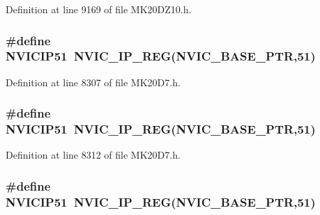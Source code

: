 Definition at line 9169 of file M\+K20\+D\+Z10.\+h.

\subsubsection[{\texorpdfstring{N\+V\+I\+C\+I\+P51}{NVICIP51}}]{\setlength{\rightskip}{0pt plus 5cm}\#define N\+V\+I\+C\+I\+P51~{\bf N\+V\+I\+C\+\_\+\+I\+P\+\_\+\+R\+EG}({\bf N\+V\+I\+C\+\_\+\+B\+A\+S\+E\+\_\+\+P\+TR},51)}\hypertarget{group___n_v_i_c___register___accessor___macros_ga0da79531db3089286af0685f8c06ed7a}{}\label{group___n_v_i_c___register___accessor___macros_ga0da79531db3089286af0685f8c06ed7a}


Definition at line 8307 of file M\+K20\+D7.\+h.

\subsubsection[{\texorpdfstring{N\+V\+I\+C\+I\+P51}{NVICIP51}}]{\setlength{\rightskip}{0pt plus 5cm}\#define N\+V\+I\+C\+I\+P51~{\bf N\+V\+I\+C\+\_\+\+I\+P\+\_\+\+R\+EG}({\bf N\+V\+I\+C\+\_\+\+B\+A\+S\+E\+\_\+\+P\+TR},51)}\hypertarget{group___n_v_i_c___register___accessor___macros_ga0da79531db3089286af0685f8c06ed7a}{}\label{group___n_v_i_c___register___accessor___macros_ga0da79531db3089286af0685f8c06ed7a}


Definition at line 8312 of file M\+K20\+D7.\+h.

\subsubsection[{\texorpdfstring{N\+V\+I\+C\+I\+P51}{NVICIP51}}]{\setlength{\rightskip}{0pt plus 5cm}\#define N\+V\+I\+C\+I\+P51~{\bf N\+V\+I\+C\+\_\+\+I\+P\+\_\+\+R\+EG}({\bf N\+V\+I\+C\+\_\+\+B\+A\+S\+E\+\_\+\+P\+TR},51)}\hypertarget{group___n_v_i_c___register___accessor___macros_ga0da79531db3089286af0685f8c06ed7a}{}\label{group___n_v_i_c___register___accessor___macros_ga0da79531db3089286af0685f8c06ed7a}


